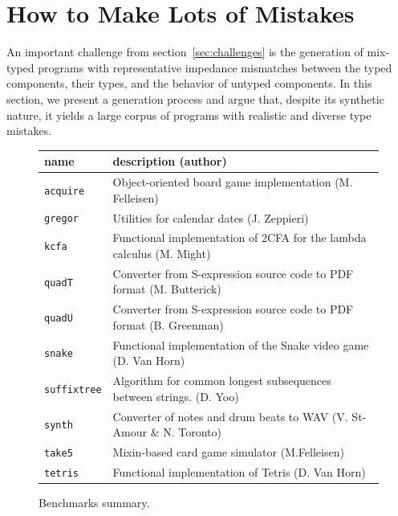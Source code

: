 \section{How to Make Lots of Mistakes} 

An important challenge from section~\ref{sec:challenges} is the generation of
mix-typed programs with representative impedance mismatches between
the typed components, their types, and the behavior of untyped components. In this section, we
present a generation process and argue that, despite its synthetic
nature, it yields a large corpus of programs with  realistic and diverse type mistakes.


\begin{figure}
\begin{tabular}{p{2cm} | p{10cm} }
  {\bf  name} & {\bf description (author)}  \\

\hline

  \texttt{acquire} & Object-oriented board game implementation (M. Felleisen)  \\%


\hline
  \texttt{gregor} & Utilities for calendar dates (J. Zeppieri) \\%


\hline
  \texttt{kcfa} & Functional implementation of 2CFA for the lambda calculus (M. Might) \\%


\hline
  \texttt{quadT} & Converter from S-expression source code to PDF format (M. Butterick)\\%

\hline
  \texttt{quadU} & Converter from S-expression source code to PDF format  (B. Greenman) \\%

\hline
  \texttt{snake} & Functional implementation of the  Snake video game (D. Van Horn) \\%

\hline
  \texttt{suffixtree} & Algorithm for common longest subsequences between strings. (D. Yoo) \\%

\hline
  \texttt{synth} & Converter of notes and drum beats to WAV (V. St-Amour \& N. Toronto) \\%

\hline
  \texttt{take5} & Mixin-based card game simulator (M.Felleisen)  \\%

\hline
  \texttt{tetris} & Functional implementation of Tetris (D. Van Horn) \\%


\end{tabular}
  \caption{Benchmarks summary.}
  \label{table:benchmark-descriptions}
\end{figure}


